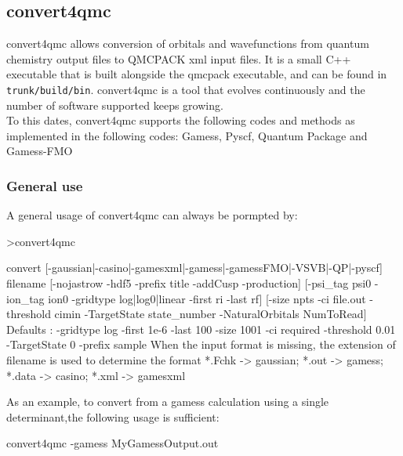 \subsection{convert4qmc}
convert4qmc allows conversion of orbitals and wavefunctions from quantum chemistry output files to QMCPACK xml input files.  It is a small C++ executable that is built alongside the qmcpack executable, and can be found in \texttt{trunk/build/bin}.
convert4qmc is a tool that evolves continuously and the number of software supported keeps growing.\\
To this dates, convert4qmc supports the following codes and methods as  implemented in the following codes: Gamess\cite{schmidt93}, Pyscf\cite{Sun2018}, Quantum Package\cite{QP} and Gamess-FMO\cite{Fedorov2004,schmidt93}


\subsubsection{General use}
A general usage of convert4qmc can always be pormpted  by:

\begin{shade}
>convert4qmc

 convert [-gaussian|-casino|-gamesxml|-gamess|-gamessFMO|-VSVB|-QP|-pyscf]
 filename                                                          
[-nojastrow -hdf5 -prefix title -addCusp -production]                                                                                           
[-psi_tag psi0 -ion_tag ion0 -gridtype log|log0|linear -first ri -last rf]
[-size npts -ci file.out -threshold cimin -TargetState state_number
-NaturalOrbitals NumToRead]                                        
Defaults : -gridtype log -first 1e-6 -last 100 -size 1001 -ci required 
-threshold 0.01 -TargetState 0 -prefix sample                                
When the input format is missing, the  extension of filename is used to determine
the format                                                      
 *.Fchk -> gaussian; *.out -> gamess; *.data -> casino; *.xml -> gamesxml
\end{shade}


As an example, to convert from a gamess calculation using a single determinant,the following usage is sufficient:\\
\begin{shade}
convert4qmc -gamess MyGamessOutput.out
\end{shade}

